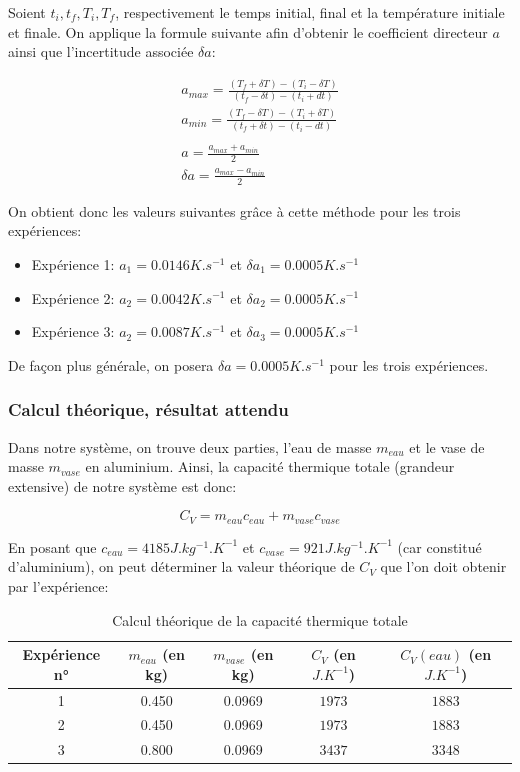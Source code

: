 \documentclass[12pt]{article}
\begin{document}
Soient $t_i, t_f, T_i, T_f$, respectivement le temps initial, final et la température initiale et finale. On applique la formule suivante afin d'obtenir le coefficient directeur $a$ ainsi que l'incertitude associée $\delta a$:

\begin{gather*}
	a_{max} = \frac{(T_f + \delta T) - (T_i - \delta T)}{(t_f - \delta t) - (t_i + dt)} \\
	a_{min} = \frac{(T_f - \delta T) - (T_i + \delta T)}{(t_f + \delta t) - (t_i - dt)} \\
	\\
	a = \frac{a_{max} + a_{min}}{2} \\
	\delta a = \frac{a_{max} - a_{min}}{2}
\end{gather*}

On obtient donc les valeurs suivantes grâce à cette méthode pour les trois expériences:
\begin{itemize}
	\item Expérience 1: $a_1 = 0.0146 K.s^{-1}$ et $\delta a_1 = 0.0005 K.s^{-1}$
	\item Expérience 2: $a_2 = 0.0042 K.s^{-1}$ et $\delta a_2 = 0.0005 K.s^{-1}$
	\item Expérience 3: $a_2 = 0.0087 K.s^{-1}$ et $\delta a_3 = 0.0005 K.s^{-1}$
\end{itemize}

De façon plus générale, on posera $\delta a = 0.0005 K.s^{-1}$ pour les trois expériences.

\newpage
\subsubsection{Calcul théorique, résultat attendu}

Dans notre système, on trouve deux parties, l'eau de masse $m_{eau}$ et le vase de masse $m_{vase}$ en aluminium. Ainsi, la capacité thermique totale (grandeur extensive) de notre système est donc:

\begin{equation}
	C_V = m_{eau}c_{eau}+ m_{vase} c_{vase}
\end{equation}

En posant que $c_{eau} = 4185 J.kg^{-1}.K^{-1}$ et $c_{vase} = 921 J.kg^{-1}.K^{-1}$ (car constitué d'aluminium), on peut déterminer la valeur théorique de $C_V$ que l'on doit obtenir par l'expérience:

\begin{table}[h!]
	\begin{center}
		\begin{tabular}{|c|c|c|c|c|}
			\hline
			Expérience n° & $m_{eau}$ (en kg) & $m_{vase}$ (en kg) & $C_V$ (en $J.K^{-1}$) & $C_V(eau)$ (en $J.K^{-1}$)\\ \hline
			1 & 0.450 & 0.0969 & $1973$ & $1883$ \\
			2 & 0.450 & 0.0969 & $1973$ & $1883$ \\
			3 & 0.800 & 0.0969 & $3437$ & $3348$ \\ \hline
		\end{tabular}
	\end{center}
	\caption{Calcul théorique de la capacité thermique totale}
\end{table}
\end{document}
